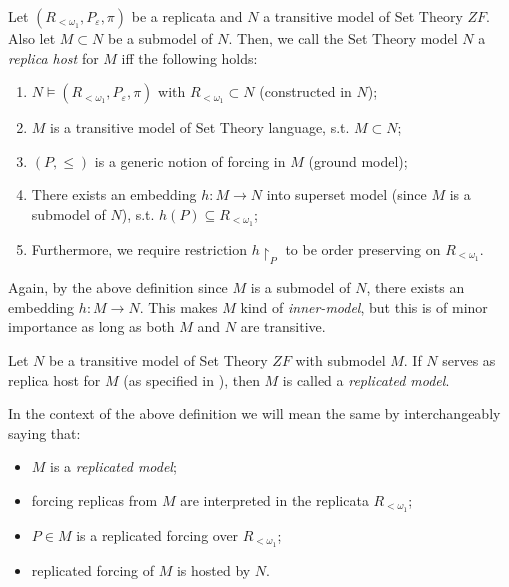 \begin{definition}\label{def_replica_host}
    Let $(R_{<\omega_1}, P_\varepsilon, \pi)$ be a replicata and $N$ a transitive model of Set Theory $ZF$. Also let $M \subset N$ be a submodel of $N$. Then, we call the Set Theory model $N$ a \textit{replica host} for $M$ iff the following holds:
    \begin{enumerate}
        \item $N \models (R_{<\omega_1}, P_\varepsilon, \pi)$ with $R_{<\omega_1} \subset N$ (constructed in $N$);
        \item $M$ is a transitive model of Set Theory language, s.t. $M \subset N$;
        \item $(P, \leq)$ is a generic notion of forcing in $M$ (ground model);
        \item There exists an embedding $h: M \to N$ into superset model (since $M$ is a submodel of $N$), s.t. $h(P) \subseteq R_{<\omega_1}$;
        \item Furthermore, we require restriction $h{\upharpoonright}_P$ to be order preserving on $R_{<\omega_1}$.
    \end{enumerate}
\end{definition}

Again, by the above definition since $M$ is a submodel of $N$, there exists an embedding $h: M \to N$. This makes $M$ kind of \textit{inner-model}, but this is of minor importance as long as both $M$ and $N$ are transitive.

\begin{definition}\label{def_replicated_model}
    Let $N$ be a transitive model of Set Theory $ZF$ with submodel $M$.
    If $N$ serves as replica host for $M$ (as specified in ), then $M$ is called a \textit{replicated model}.
\end{definition}

In the context of the above definition we will mean the same by interchangeably saying that: 
\begin{itemize}
    \item $M$ is a \textit{replicated model};
    \item forcing replicas from $M$ are interpreted in the replicata $R_{<\omega_1}$;
    \item $P \in M$ is a replicated forcing over $R_{<\omega_1}$;
    \item replicated forcing of $M$ is hosted by $N$.
\end{itemize}


